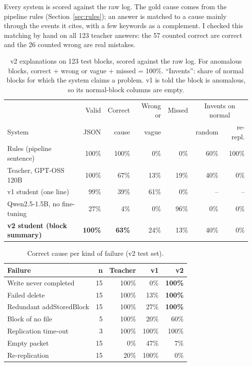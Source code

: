 \documentclass[11pt,a4paper]{article}
\begin{document}
Every system is scored against the raw log. The gold cause comes from the pipeline rules
(Section~\ref{sec:rules}); an answer is matched to a cause mainly through the events it cites,
with a few keywords as a complement. I checked this matching by hand on all 123 teacher answers:
the 57 counted correct are correct and the 26 counted wrong are real mistakes.

\begin{table}[t]
\centering
\caption{v2 explanations on 123 test blocks, scored against the raw log. For anomalous blocks,
correct + wrong or vague + missed = 100\%. ``Invents'': share of normal blocks for which the
system claims a problem. v1 is told the block is anomalous, so its normal-block columns are empty.}
\label{tab:v2}
\small\setlength{\tabcolsep}{4pt}
\begin{tabular}{lrrrrrr}
\toprule
 & Valid & Correct & Wrong or & Missed & \multicolumn{2}{c}{Invents on normal} \\
System & JSON & cause & vague & & random & re-repl. \\
\midrule
Rules (pipeline sentence) & 100\% & 100\% & 0\% & 0\% & 60\% & 100\% \\
Teacher, GPT-OSS 120B & 100\% & 67\% & 13\% & 19\% & 40\% & 0\% \\
v1 student (one line) & 99\% & 39\% & 61\% & 0\% & -- & -- \\
Qwen2.5-1.5B, no fine-tuning & 27\% & 4\% & 0\% & 96\% & 0\% & 0\% \\
\textbf{v2 student (block summary)} & \textbf{100\%} & \textbf{63\%} & 24\% & 13\% & 40\% & 0\% \\
\bottomrule
\end{tabular}
\end{table}

\begin{table}[t]
\centering
\caption{Correct cause per kind of failure (v2 test set).}
\label{tab:v2cat}
\small
\begin{tabular}{lrrrr}
\toprule
Failure & n & Teacher & v1 & v2 \\
\midrule
Write never completed & 15 & 100\% & 0\% & \textbf{100\%} \\
Failed delete & 15 & 100\% & 13\% & \textbf{100\%} \\
Redundant addStoredBlock & 15 & 100\% & 27\% & \textbf{100\%} \\
Block of no file & 5 & 100\% & 20\% & 60\% \\
Replication time-out & 3 & 100\% & 100\% & 100\% \\
Empty packet & 15 & 0\% & 47\% & 7\% \\
Re-replication & 15 & 20\% & 100\% & 0\% \\
\bottomrule
\end{tabular}
\end{table}
\end{document}
